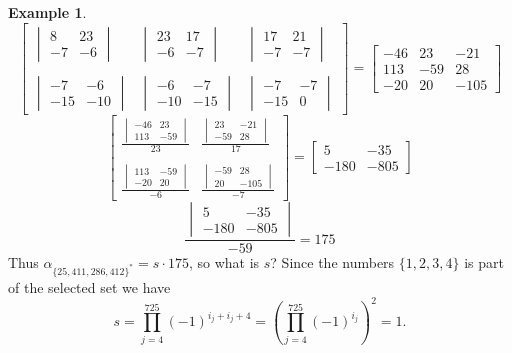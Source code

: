 \documentclass[a4paper,12pt]{book}
\theoremstyle{plain}
\theoremstyle{definition}
\newtheorem{Example}[equation]{Example}
\begin{document}
\begin{Example}
\[\begin{bmatrix}
\begin{vmatrix}
				8 & 23 \\ -7 & -6
			\end{vmatrix} & \begin{vmatrix}
				23 & 17 \\ -6 & -7
			\end{vmatrix} & \begin{vmatrix}
				17 & 21 \\ -7 & -7
			\end{vmatrix} \\ & & \\ \begin{vmatrix}
				-7 & -6 \\ -15 & -10
			\end{vmatrix} & \begin{vmatrix}
				-6 & -7 \\ -10 & -15
			\end{vmatrix} & \begin{vmatrix}
				-7 & -7 \\ -15 & 0
			\end{vmatrix}
		\end{bmatrix} = \begin{bmatrix}
			-46 & 23 & -21 \\
			113 & -59 & 28 \\
			-20 & 20 & -105
		\end{bmatrix}
	\]
	\[
		\begin{bmatrix}
			\frac{\begin{vmatrix}
				-46 & 23 \\ 113 & -59
			\end{vmatrix}}{23} & \frac{\begin{vmatrix}
				23 & -21 \\ -59 & 28
			\end{vmatrix}}{17} \\ & \\ \frac{\begin{vmatrix}
				113 & -59 \\ -20 & 20
			\end{vmatrix}}{-6} & \frac{\begin{vmatrix}
				-59 & 28 \\ 20 & -105
			\end{vmatrix}}{-7}
		\end{bmatrix} = \begin{bmatrix}
			5 & -35 \\ -180 & -805
		\end{bmatrix}
	\]
	\[
		\frac{\begin{vmatrix}
			5 & -35 \\ -180 & -805
		\end{vmatrix}}{-59} = 175
	\]
	Thus \( \alpha_{\{25, 411, 286, 412\}^*} = s \cdot 175 \), so what is
	\( s \)? Since the numbers \( \{1,2,3,4\} \) is part of the selected set
	we have
	\[
		s = \prod_{j = 4}^{725} (-1)^{i_j + i_j + 4} = 
		\left(\prod_{j = 4}^{725} (-1)^{i_j}\right)^2 = 1.
	\]
\end{Example}
\end{document}

